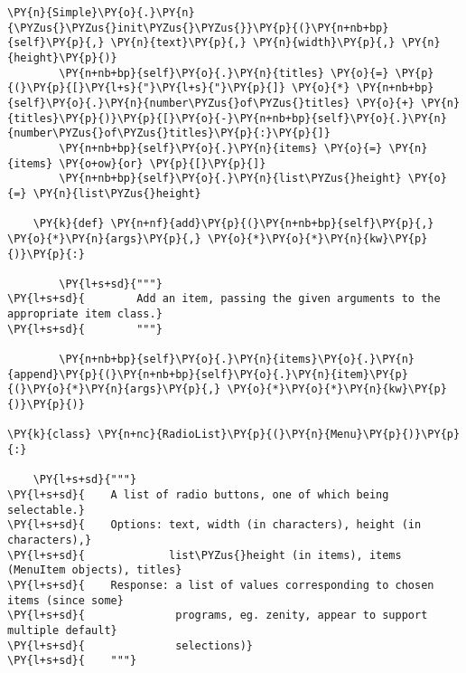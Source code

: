 \begin{Verbatim}[commandchars=\\\{\}]
        \PY{n}{Simple}\PY{o}{.}\PY{n}{\PYZus{}\PYZus{}init\PYZus{}\PYZus{}}\PY{p}{(}\PY{n+nb+bp}{self}\PY{p}{,} \PY{n}{text}\PY{p}{,} \PY{n}{width}\PY{p}{,} \PY{n}{height}\PY{p}{)}
        \PY{n+nb+bp}{self}\PY{o}{.}\PY{n}{titles} \PY{o}{=} \PY{p}{(}\PY{p}{[}\PY{l+s}{"}\PY{l+s}{"}\PY{p}{]} \PY{o}{*} \PY{n+nb+bp}{self}\PY{o}{.}\PY{n}{number\PYZus{}of\PYZus{}titles} \PY{o}{+} \PY{n}{titles}\PY{p}{)}\PY{p}{[}\PY{o}{-}\PY{n+nb+bp}{self}\PY{o}{.}\PY{n}{number\PYZus{}of\PYZus{}titles}\PY{p}{:}\PY{p}{]}
        \PY{n+nb+bp}{self}\PY{o}{.}\PY{n}{items} \PY{o}{=} \PY{n}{items} \PY{o+ow}{or} \PY{p}{[}\PY{p}{]}
        \PY{n+nb+bp}{self}\PY{o}{.}\PY{n}{list\PYZus{}height} \PY{o}{=} \PY{n}{list\PYZus{}height}

    \PY{k}{def} \PY{n+nf}{add}\PY{p}{(}\PY{n+nb+bp}{self}\PY{p}{,} \PY{o}{*}\PY{n}{args}\PY{p}{,} \PY{o}{*}\PY{o}{*}\PY{n}{kw}\PY{p}{)}\PY{p}{:}

        \PY{l+s+sd}{"""}
\PY{l+s+sd}{        Add an item, passing the given arguments to the appropriate item class.}
\PY{l+s+sd}{        """}

        \PY{n+nb+bp}{self}\PY{o}{.}\PY{n}{items}\PY{o}{.}\PY{n}{append}\PY{p}{(}\PY{n+nb+bp}{self}\PY{o}{.}\PY{n}{item}\PY{p}{(}\PY{o}{*}\PY{n}{args}\PY{p}{,} \PY{o}{*}\PY{o}{*}\PY{n}{kw}\PY{p}{)}\PY{p}{)}

\PY{k}{class} \PY{n+nc}{RadioList}\PY{p}{(}\PY{n}{Menu}\PY{p}{)}\PY{p}{:}

    \PY{l+s+sd}{"""}
\PY{l+s+sd}{    A list of radio buttons, one of which being selectable.}
\PY{l+s+sd}{    Options: text, width (in characters), height (in characters),}
\PY{l+s+sd}{             list\PYZus{}height (in items), items (MenuItem objects), titles}
\PY{l+s+sd}{    Response: a list of values corresponding to chosen items (since some}
\PY{l+s+sd}{              programs, eg. zenity, appear to support multiple default}
\PY{l+s+sd}{              selections)}
\PY{l+s+sd}{    """}


\end{Verbatim}
